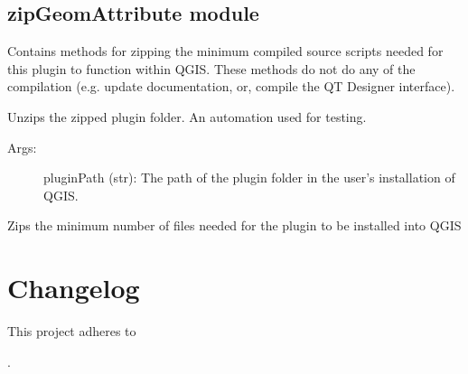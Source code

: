 \documentclass[a4paper,11pt,english]{sphinxmanual}
\begin{document}
\section{zipGeomAttribute module}
\label{\detokenize{API:module-zipGeomAttribute}}\label{\detokenize{API:zipgeomattribute-module}}
Contains methods for zipping the minimum compiled source scripts needed for this plugin to function within QGIS.  These
methods do not do any of the compilation (e.g. update documentation, or, compile the QT Designer interface).

\begin{fulllineitems}
\label{\detokenize{API:zipGeomAttribute.installGeomAttributeFromZip}}
Unzips the zipped plugin folder.  An automation used for testing.
\begin{description}
\item[{Args:}] \leavevmode
pluginPath (str): The path of the plugin folder in the user’s installation of QGIS.

\end{description}

\end{fulllineitems}


\begin{fulllineitems}
\label{\detokenize{API:zipGeomAttribute.zipGeomAttribute}}
Zips the minimum number of files needed for the plugin to be installed into QGIS

\end{fulllineitems}



\chapter{Changelog}
\label{\detokenize{changelog:changelog}}\label{\detokenize{changelog::doc}}
This project adheres to %
\begin{footnote}[18]\sphinxAtStartFootnote
{}
%
\end{footnote}.
\end{document}
